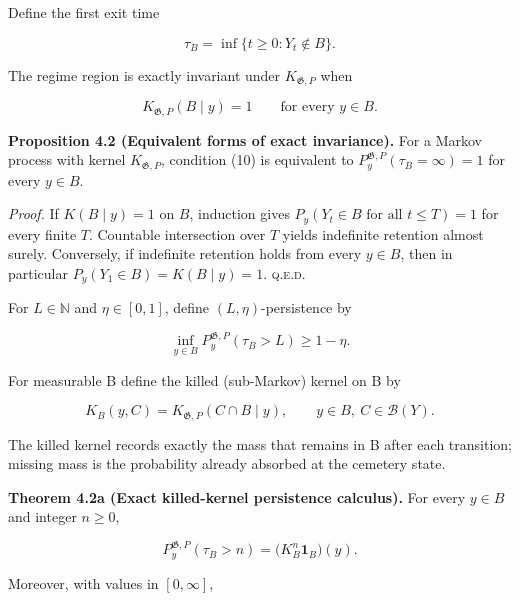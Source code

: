 \documentclass[10pt]{article}
\begin{document}
Define the first exit time

\begin{equation}
\tau_B=\inf\{t\ge 0:Y_t\notin B\}.
\tag{9}\label{eq:9}
\end{equation}

The regime region is exactly invariant under \(K_{\mathfrak G,P}\) when

\begin{equation}
K_{\mathfrak G,P}(B\mid y)=1\qquad\text{for every }y\in B.
\tag{10}\label{eq:10}
\end{equation}

\textbf{Proposition 4.2 (Equivalent forms of exact invariance).} For a
Markov process with kernel \(K_{\mathfrak G,P}\), condition (10) is
equivalent to \(P^{\mathfrak G,P}_y(\tau_B=\infty)=1\) for every
\(y\in{}B\).

\emph{Proof.} If $K(B\mid y)=1$ on $B$, induction gives $P_y(Y_t\in B\text{ for all }t\le T)=1$ for every finite $T$. Countable intersection over $T$ yields indefinite retention almost surely. Conversely, if indefinite retention holds from every $y\in B$, then in particular $P_y(Y_1\in B)=K(B\mid y)=1$. \hfill\textsc{q.e.d.}

For \(L\in\mathbb N\) and \(\eta\in{}[0,1]\), define \((L,\eta)\)-persistence
by

\begin{equation}
\inf_{y\in B} P_y^{\mathfrak G,P}(\tau_B>L)\ge 1-\eta.
\tag{11}\label{eq:11}
\end{equation}

For measurable B define the killed (sub-Markov) kernel on B by

\begin{equation}
K_B(y,C)=K_{\mathfrak G,P}(C\cap B\mid y),\qquad y\in B,\ C\in\mathcal B(Y).
\tag{11a}\label{eq:11a}
\end{equation}

The killed kernel records exactly the mass that remains in B after each transition; missing mass is the probability already absorbed at the cemetery state.

\textbf{Theorem 4.2a (Exact killed-kernel persistence calculus).} For every \(y\in B\) and integer \(n\ge0\),

\begin{equation}
P_y^{\mathfrak G,P}(\tau_B>n)=\bigl(K_B^n\mathbf 1_B\bigr)(y).
\tag{11b}\label{eq:11b}
\end{equation}

Moreover, with values in \([0,\infty]\),
\end{document}
